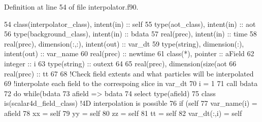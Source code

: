 Definition at line 54 of file interpolator.\+f90.


\begin{DoxyCode}
54     \textcolor{keywordtype}{class}(interpolator\_class), \textcolor{keywordtype}{intent(in)} :: self
55     \textcolor{keywordtype}{type}(aot\_class), \textcolor{keywordtype}{intent(in)} :: aot
56     \textcolor{keywordtype}{type}(background\_class), \textcolor{keywordtype}{intent(in)} :: bdata
57     \textcolor{keywordtype}{real(prec)}, \textcolor{keywordtype}{intent(in)} :: time
58     \textcolor{keywordtype}{real(prec)}, \textcolor{keywordtype}{dimension(:,:)}, \textcolor{keywordtype}{intent(out)} :: var\_dt
59     \textcolor{keywordtype}{type}(string), \textcolor{keywordtype}{dimension(:)}, \textcolor{keywordtype}{intent(out)} :: var\_name
60     \textcolor{keywordtype}{real(prec)} :: newtime
61     \textcolor{keywordtype}{class}(*), \textcolor{keywordtype}{pointer} :: aField
62     \textcolor{keywordtype}{integer} :: i
63     \textcolor{keywordtype}{type}(string) :: outext
64 
65     \textcolor{keywordtype}{real(prec)}, \textcolor{keywordtype}{dimension(size(aot%
66     \textcolor{keywordtype}{real(prec)} :: tt
67 
68     \textcolor{comment}{!Check field extents and what particles will be interpolated}
69     \textcolor{comment}{!interpolate each field to the correspoing slice in var\_dt}
70     i = 1
71     \textcolor{keyword}{call }bdata%
72     \textcolor{keywordflow}{do} \textcolor{keywordflow}{while}(bdata%
73         afield => bdata%
74         \textcolor{keywordflow}{select type}(afield)        
75 \textcolor{keywordflow}{        class is}(scalar4d\_field\_class)          \textcolor{comment}{!4D interpolation is possible}
76             \textcolor{keywordflow}{if} (self%
77                 var\_name(i) = afield%
78                 xx = self%
79                 yy = self%
80                 zz = self%
81                 tt = self%
82                 var\_dt(:,i) = self%
}
\end{DoxyCode}
